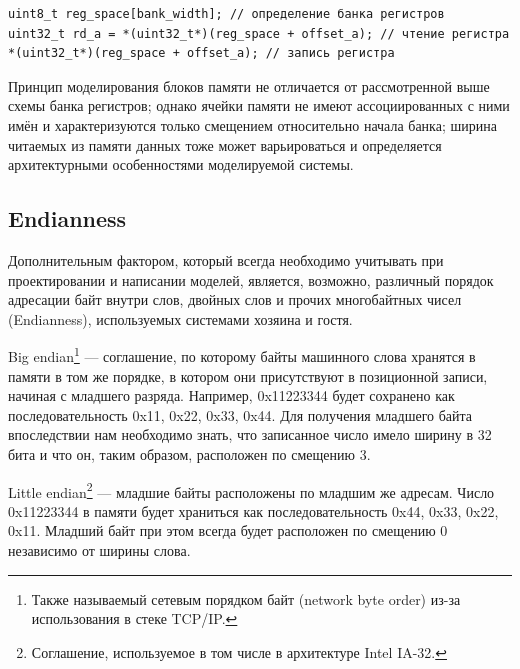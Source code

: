 \begin{lstlisting}
uint8_t reg_space[bank_width]; // определение банка регистров
uint32_t rd_a = *(uint32_t*)(reg_space + offset_a); // чтение регистра
*(uint32_t*)(reg_space + offset_a); // запись регистра  
\end{lstlisting}

Принцип моделирования блоков памяти не отличается от рассмотренной выше схемы банка регистров; однако ячейки памяти не имеют ассоциированных с ними имён и характеризуются только смещением относительно начала банка; ширина читаемых из памяти данных тоже может варьироваться и определяется архитектурными особенностями моделируемой системы.

\subsection{Endianness}


Дополнительным фактором, который всегда необходимо учитывать при проектировании и написании моделей, является, возможно, различный порядок адресации байт внутри слов, двойных слов и прочих многобайтных чисел (\abbr Endianness), используемых системами хозяина и гостя.

\begin{itemize*}
\item Big endian\footnote{Также называемый сетевым порядком байт (\abbr network byte order) из-за использования в стеке TCP/IP.} --- соглашение, по которому байты машинного слова хранятся в памяти в том же порядке, в котором они присутствуют в позиционной записи, начиная с младшего разряда. Например, 0x11223344 будет сохранено как последовательность 0x11, 0x22, 0x33, 0x44. Для получения младшего байта впоследствии нам необходимо знать, что записанное число имело ширину в 32 бита и что он, таким образом, расположен по смещению 3.

\item Little endian\footnote{Соглашение, используемое в том числе в архитектуре Intel IA-32.} --- младшие байты расположены по младшим же адресам. Число 0x11223344 в памяти будет храниться как последовательность 0x44, 0x33, 0x22, 0x11. Младший байт при этом всегда будет расположен по смещению 0 независимо от ширины слова.
\end{itemize*}

